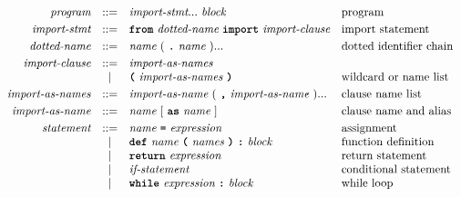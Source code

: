 \[\begin{array}{rcll}

\textit{program}            & ::= & \textit{import-stmt} ... \ \textit{block}                                                & \text{program}                          \\[1mm]
\textit{import-stmt}        & ::= & \term{from}\ \textit{dotted-name}\ \term{import}\ \textit{import-clause}                 & \text{import statement}                 \\[1mm]
\textit{dotted-name}        & ::= & \textit{name}\ (\ \term{.}\ \textit{name}\ )...                                          & \text{dotted identifier chain}          \\[1mm]
\textit{import-clause}      & ::= & \textit{import-as-names}                                                                 &                                         \\
                            & |   & \term{(}\ \textit{import-as-names}\ \term{)}                                             & \text{wildcard or name list}            \\[1mm]
\textit{import-as-names}    & ::= & \textit{import-as-name}\ (\ \term{,}\ \textit{import-as-name}\ )...                      & \text{clause name list}                 \\[1mm]
\textit{import-as-name}     & ::= & \textit{name}\ [\ \term{as}\ \textit{name}\ ]                                            & \text{clause name and alias}            \\[1mm]
\textit{statement}          & ::= & \textit{name}\ \term{=}\ \textit{expression}                                             & \text{assignment}             \\
                            & |   & \term{def}\ \textit{name}\ \term{(}\ \textit{names}\ \term{)}\ \term{:}\ \textit{block}  & \text{function definition}             \\
                            & |   & \term{return}\ \textit{expression}                                                       & \text{return statement}                 \\
                            & |   & \textit{if-statement}                                                                    & \text{conditional statement}            \\
                            & |   & \term{while}\ \textit{expression}\ \term{:}\ \textit{block}                              & \text{while loop}                       \\

\end{array}\]
